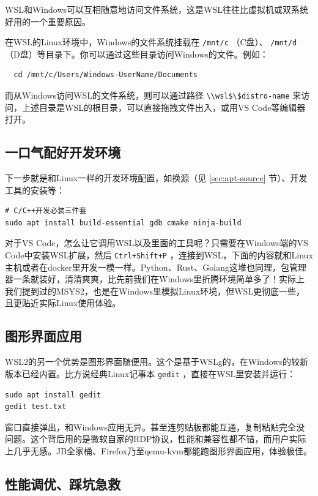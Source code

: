 WSL和Windows可以互相随意地访问文件系统，这是WSL往往比虚拟机或双系统好用的一个重要原因。

在WSL的Linux环境中，Windows的文件系统挂载在 \texttt{/mnt/c} （C盘）、 \texttt{/mnt/d} （D盘）等目录下。你可以通过这些目录访问Windows的文件。例如：
\begin{verbatim}
  cd /mnt/c/Users/Windows-UserName/Documents
\end{verbatim}

而从Windows访问WSL的文件系统，则可以通过路径 \texttt{\textbackslash \textbackslash wsl\$\textbackslash\$distro-name} 来访问，上述目录是WSL的根目录，可以直接拖拽文件出入，或用VS Code等编辑器打开。

\subsection{一口气配好开发环境}

下一步就是和Linux一样的开发环境配置，如换源（见 \ref{sec:apt-source} 节）、开发工具的安装等：
\begin{verbatim}
# C/C++开发必装三件套
sudo apt install build-essential gdb cmake ninja-build
\end{verbatim}

对于VS Code，怎么让它调用WSL以及里面的工具呢？只需要在Windows端的VS Code中安装WSL扩展，然后 \texttt{Ctrl+Shift+P} ，连接到WSL，下面的内容就和Linux主机或者在docker里开发一模一样。Python、Rust、Golang这堆也同理，包管理器一条就装好，清清爽爽，比先前我们在Windows里折腾环境简单多了！实际上我们提到过的MSYS2，也是在Windows里模拟Linux环境，但WSL更彻底一些，且更贴近实际Linux使用体验。

\subsection{图形界面应用}

WSL2的另一个优势是图形界面随便用。这个是基于WSLg的，在Windows的较新版本已经内置。比方说经典Linux记事本 \texttt{gedit} ，直接在WSL里安装并运行：
\begin{verbatim}
sudo apt install gedit
gedit test.txt
\end{verbatim}
窗口直接弹出，和Windows应用无异。甚至连剪贴板都能互通，复制粘贴完全没问题。这个背后用的是微软自家的RDP协议，性能和兼容性都不错，而用户实际上几乎无感。JB全家桶、Firefox乃至qemu-kvm都能跑图形界面应用，体验极佳。

\subsection{性能调优、踩坑急救}

